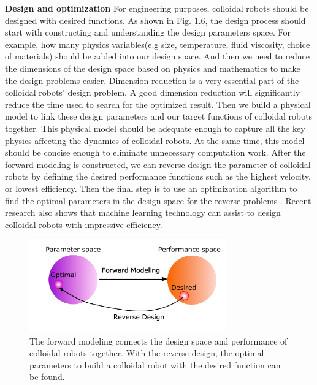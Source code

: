 \textbf{Design and optimization} For engineering purposes, colloidal robots should be designed with desired functions\autocite{liebchen2019optimal}. As shown in Fig. 1.6, the design process should start with constructing and understanding the design parameters space. For example, how many physics variables(e.g size, temperature, fluid viscosity, choice of materials) should be added into our design space. And then we  need to reduce the dimensions of the design space based on physics and mathematics to make the design problems easier. Dimension reduction is a very essential part of the colloidal robots' design problem. A good dimension reduction will significantly reduce the time used to search for the optimized result. Then we build a physical model to link these design parameters and our target functions of colloidal robots together. This physical model should be adequate enough  to capture all the key physics affecting the dynamics of colloidal robots. At the same time, this model should be concise enough to eliminate unnecessary computation work. After the forward modeling is constructed, we can reverse design the parameter of colloidal robots by defining the desired performance functions such as the highest velocity, or lowest efficiency. Then the final step is to use an optimization algorithm to find the optimal parameters in the design space for the reverse problems \autocite{ward1963hierarchical,nocedal2006numerical}. Recent research also shows that machine learning technology can assist to design colloidal robots with impressive efficiency\autocite{yang2020micro,yang2020cargo,yang2019deep,tsang2018self}.
\begin{figure}
\centering
\includegraphics[width=8.5cm]{figures/1_6.pdf}
\caption{The forward modeling connects the design space and performance of colloidal robots together. With the reverse design, the optimal parameters to build a colloidal robot with the desired function can be found.}
\label{fig:1.6}
\end{figure}



